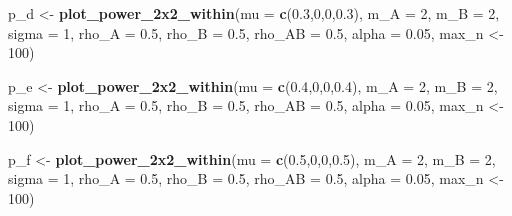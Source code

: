 \documentclass[]{article}
\newenvironment{Shaded}{\begin{snugshade}}{\end{snugshade}}
\newcommand{\KeywordTok}[1]{\textcolor[rgb]{0.13,0.29,0.53}{\textbf{#1}}}
\newcommand{\DataTypeTok}[1]{\textcolor[rgb]{0.13,0.29,0.53}{#1}}
\newcommand{\DecValTok}[1]{\textcolor[rgb]{0.00,0.00,0.81}{#1}}
\newcommand{\FloatTok}[1]{\textcolor[rgb]{0.00,0.00,0.81}{#1}}
\newcommand{\StringTok}[1]{\textcolor[rgb]{0.31,0.60,0.02}{#1}}
\newcommand{\NormalTok}[1]{#1}
\begin{document}
\begin{Shaded}
\begin{Highlighting}[]
\NormalTok{p_d <-}\StringTok{ }\KeywordTok{plot_power_2x2_within}\NormalTok{(}\DataTypeTok{mu =} \KeywordTok{c}\NormalTok{(}\FloatTok{0.3}\NormalTok{,}\DecValTok{0}\NormalTok{,}\DecValTok{0}\NormalTok{,}\FloatTok{0.3}\NormalTok{), }
                      \DataTypeTok{m_A =} \DecValTok{2}\NormalTok{, }
                      \DataTypeTok{m_B =} \DecValTok{2}\NormalTok{, }
                      \DataTypeTok{sigma =} \DecValTok{1}\NormalTok{, }
                      \DataTypeTok{rho_A =} \FloatTok{0.5}\NormalTok{, }
                      \DataTypeTok{rho_B =} \FloatTok{0.5}\NormalTok{, }
                      \DataTypeTok{rho_AB =} \FloatTok{0.5}\NormalTok{, }
                      \DataTypeTok{alpha =} \FloatTok{0.05}\NormalTok{,}
\NormalTok{                      max_n <-}\StringTok{ }\DecValTok{100}\NormalTok{)}

\NormalTok{p_e <-}\StringTok{ }\KeywordTok{plot_power_2x2_within}\NormalTok{(}\DataTypeTok{mu =} \KeywordTok{c}\NormalTok{(}\FloatTok{0.4}\NormalTok{,}\DecValTok{0}\NormalTok{,}\DecValTok{0}\NormalTok{,}\FloatTok{0.4}\NormalTok{), }
                      \DataTypeTok{m_A =} \DecValTok{2}\NormalTok{, }
                      \DataTypeTok{m_B =} \DecValTok{2}\NormalTok{, }
                      \DataTypeTok{sigma =} \DecValTok{1}\NormalTok{, }
                      \DataTypeTok{rho_A =} \FloatTok{0.5}\NormalTok{, }
                      \DataTypeTok{rho_B =} \FloatTok{0.5}\NormalTok{, }
                      \DataTypeTok{rho_AB =} \FloatTok{0.5}\NormalTok{, }
                      \DataTypeTok{alpha =} \FloatTok{0.05}\NormalTok{,}
\NormalTok{                      max_n <-}\StringTok{ }\DecValTok{100}\NormalTok{)}

\NormalTok{p_f <-}\StringTok{ }\KeywordTok{plot_power_2x2_within}\NormalTok{(}\DataTypeTok{mu =} \KeywordTok{c}\NormalTok{(}\FloatTok{0.5}\NormalTok{,}\DecValTok{0}\NormalTok{,}\DecValTok{0}\NormalTok{,}\FloatTok{0.5}\NormalTok{), }
                      \DataTypeTok{m_A =} \DecValTok{2}\NormalTok{, }
                      \DataTypeTok{m_B =} \DecValTok{2}\NormalTok{, }
                      \DataTypeTok{sigma =} \DecValTok{1}\NormalTok{, }
                      \DataTypeTok{rho_A =} \FloatTok{0.5}\NormalTok{, }
                      \DataTypeTok{rho_B =} \FloatTok{0.5}\NormalTok{, }
                      \DataTypeTok{rho_AB =} \FloatTok{0.5}\NormalTok{, }
                      \DataTypeTok{alpha =} \FloatTok{0.05}\NormalTok{,}
\NormalTok{                      max_n <-}\StringTok{ }\DecValTok{100}\NormalTok{)}


\end{Highlighting}
\end{Shaded}
\end{document}
